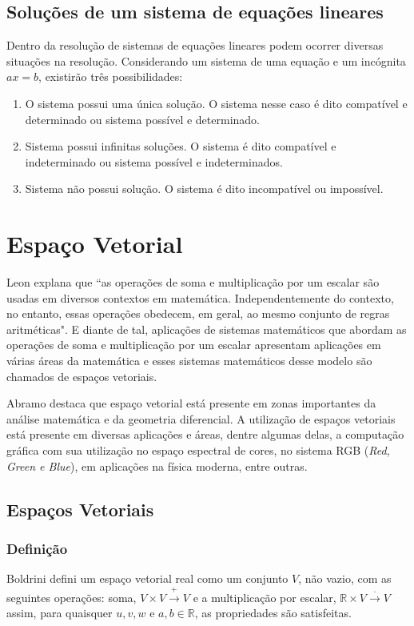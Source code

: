 \subsection{Soluções de um sistema de equações lineares}
\noindent Dentro da resolução de sistemas de equações lineares podem ocorrer diversas situações na resolução. Considerando um sistema de uma equação e um incógnita $ax = b$, existirão três possibilidades:
\begin{enumerate}
    \item O sistema possui uma única solução. O sistema nesse caso é dito compatível e determinado ou sistema possível e determinado.
    \item Sistema possui infinitas soluções. O sistema é dito compatível e indeterminado ou sistema possível e indeterminados.
    \item Sistema não possui solução. O sistema é dito incompatível ou impossível. 
\end{enumerate}

\section{Espaço Vetorial}
\noindent Leon \cite{1998:Leon} explana que ``as operações de soma e multiplicação por um escalar são usadas em diversos contextos em matemática. Independentemente do contexto, no entanto, essas operações obedecem, em geral, ao mesmo conjunto de regras aritméticas". E diante de tal, aplicações de sistemas matemáticos que abordam as operações de soma e multiplicação por um escalar apresentam aplicações em várias áreas da matemática e esses sistemas matemáticos desse modelo são chamados de espaços vetoriais. 

Abramo \cite{2016:Abramo} destaca que espaço vetorial está presente em zonas importantes da análise matemática e da geometria diferencial. A utilização de espaços vetoriais está presente em diversas aplicações e áreas, dentre algumas delas, a computação gráfica com sua utilização no espaço espectral de cores, no sistema RGB (\textit{Red, Green e Blue}), em aplicações na física moderna, entre outras.

\subsection{Espaços Vetoriais}
\subsubsection{Definição}
\noindent Boldrini \cite{1980:Boldrini} defini um espaço vetorial real como um conjunto $V$, não vazio, com as seguintes operações: soma, $V\times V\overset{+}{\rightarrow}V$ e a multiplicação por escalar, $\mathbb{R}\times V\overset{\cdot}{\rightarrow}V$ assim, para quaisquer $u, v, w$ e $a, b \in \mathbb{R}$, as propriedades são satisfeitas.

